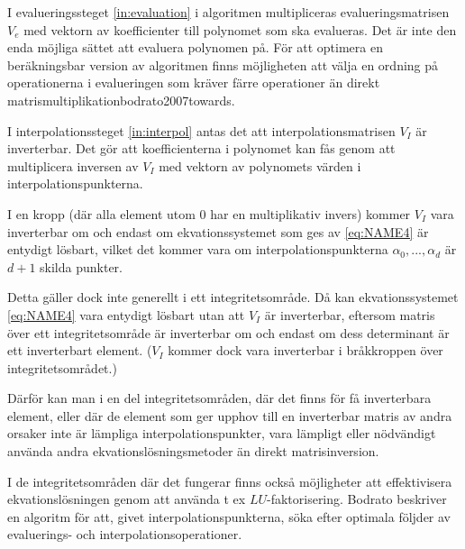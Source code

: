 I evalueringssteget \ref{in:evaluation} i algoritmen multipliceras evalueringsmatrisen
$V_e$ med vektorn av
koefficienter till polynomet som ska evalueras. Det är inte den enda möjliga sättet
att evaluera polynomen på. För att optimera en beräkningsbar version av
algoritmen finns möjligheten att välja en ordning på operationerna i
evalueringen som kräver
färre operationer än direkt matrismultiplikation{bodrato2007towards}.

I interpolationssteget \ref{in:interpol} antas det att interpolationsmatrisen
$V_I$ är inverterbar. Det
gör att koefficienterna i polynomet kan fås genom att multiplicera inversen
av $V_I$ med vektorn av polynomets värden i interpolationspunkterna.

I en kropp (där alla element utom 0 har en multiplikativ invers) kommer $V_I$
vara inverterbar om och endast om ekvationssystemet som ges av \ref{eq:NAME4}
är entydigt lösbart, vilket det kommer vara om  interpolationspunkterna
$\alpha_0, ...,  \alpha_d$ är $d + 1$ skilda punkter.

Detta gäller dock inte generellt i ett integritetsområde.
Då kan ekvationssystemet \ref{eq:NAME4} vara entydigt lösbart
utan att $V_I$ är inverterbar, eftersom matris över ett integritetsområde
är inverterbar om och endast om dess determinant är ett inverterbart
element\cite{sombatboriboon2011some}.
($V_I$ kommer dock vara inverterbar i bråkkroppen över integritetsområdet.)

Därför kan man i en del integritetsområden, där det finns för få inverterbara element,
eller där de element som ger upphov till en inverterbar matris av andra orsaker inte är
lämpliga interpolationspunkter, vara lämpligt eller nödvändigt använda andra
ekvationslösningsmetoder än direkt matrisinversion.


I de integritetsområden där det fungerar finns också möjligheter att effektivisera
ekvationslösningen genom att använda t ex $LU$-faktorisering.
Bodrato\cite{bodrato2007towards}\cite{bodrato2007integer} beskriver en algoritm för att, givet
interpolationspunkterna, söka efter optimala följder av evaluerings- och interpolationsoperationer.

